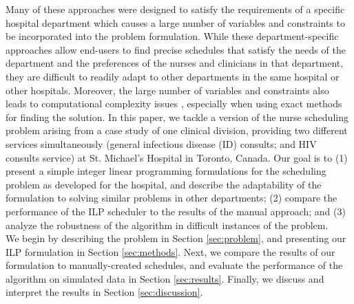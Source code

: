 
Many of these approaches were designed to satisfy the requirements of a specific hospital department which causes a large number of variables and constraints to be incorporated into the problem formulation. While these department-specific approaches allow end-users to find precise schedules that satisfy the needs of the department and the preferences of the nurses and clinicians in that department, they are difficult to readily adapt to other departments in the same hospital or other hospitals. %
Moreover, the large number of variables and constraints also leads to computational complexity issues \cite{goos_complexity_1996}, especially when using exact methods for finding the solution. In this paper, we tackle a version of the nurse scheduling problem arising from a case study of one clinical division, providing two different services simultaneously (general infectious disease (ID) consults; and HIV consults service) at St. Michael's Hospital in Toronto, Canada. Our goal is to (1) present a simple integer linear programming formulations for the scheduling problem as developed for the hospital, and describe the adaptability of the formulation to solving similar problems in other departments; (2) compare the performance of the ILP scheduler to the results of the manual approach; and (3) analyze the robustness of the algorithm in difficult instances of the problem. \\

We begin by describing the problem in Section \ref{sec:problem}, and presenting our ILP formulation in Section \ref{sec:methods}. Next, we compare the results of our formulation to manually-created schedules, and evaluate the performance of the algorithm on simulated data in Section \ref{sec:results}. Finally, we discuss and interpret the results in Section \ref{sec:discussion}. %